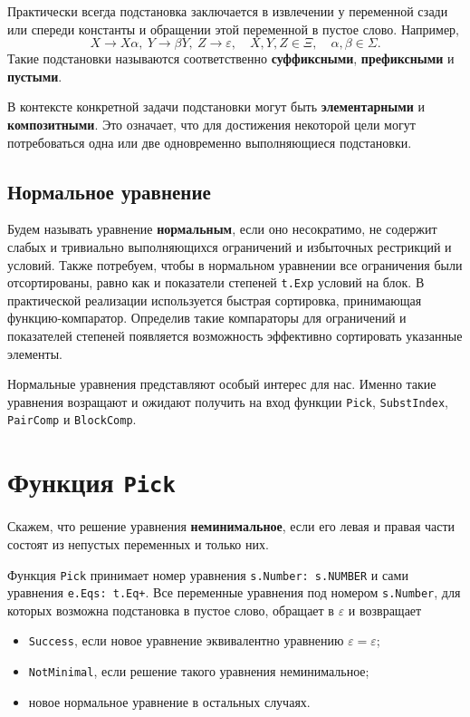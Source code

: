 \documentclass[12pt]{article}
\begin{document}
Практически всегда подстановка заключается в извлечении у переменной сзади или
спереди константы и обращении этой переменной в пустое слово. Например,
\begin{displaymath}
  X \to X \alpha, \ Y \to \beta Y, \ Z \to \varepsilon, \quad X, Y, Z \in \Xi,
  \quad \alpha, \beta \in \Sigma.
\end{displaymath}
Такие подстановки называются соответственно \textbf{суффиксными},
\textbf{префиксными} и \textbf{пустыми}.

В контексте конкретной задачи подстановки могут быть \textbf{элементарными} и
\textbf{композитными}. Это означает, что для достижения некоторой цели могут
потребоваться одна или две одновременно выполняющиеся подстановки.


\subsection{Нормальное уравнение}

Будем называть уравнение \textbf{нормальным}, если оно несократимо, не содержит
слабых и тривиально выполняющихся ограничений и избыточных рестрикций и условий.
Также потребуем, чтобы в нормальном уравнении все ограничения были
отсортированы, равно как и показатели степеней \texttt{t.Exp} условий на блок.
В практической реализации используется быстрая сортировка, принимающая
функцию-компаратор. Определив такие компараторы для ограничений и показателей
степеней появляется возможность эффективно сортировать указанные элементы.

Нормальные уравнения представляют особый интерес для нас. Именно такие уравнения
возращают и ожидают получить на вход функции \texttt{Pick}, \texttt{SubstIndex},
\texttt{PairComp} и \texttt{BlockComp}.



\section{Функция \texttt{Pick}}

Скажем, что решение уравнения \textbf{неминимальное}, если его левая и правая
части состоят из непустых переменных и только них.

Функция \texttt{Pick} принимает номер уравнения \texttt{s.Number: s.NUMBER}
и сами уравнения \texttt{e.Eqs: t.Eq+}. Все переменные уравнения под номером
\texttt{s.Number}, для которых возможна подстановка в пустое слово, обращает в
$\varepsilon$ и возвращает
\begin{itemize}
  \item \texttt{Success}, если новое уравнение эквивалентно уравнению
  $\varepsilon = \varepsilon$;
  
  \item \texttt{NotMinimal}, если решение такого уравнения неминимальное;
    
  \item новое нормальное уравнение в остальных случаях.
\end{itemize}
\end{document}
